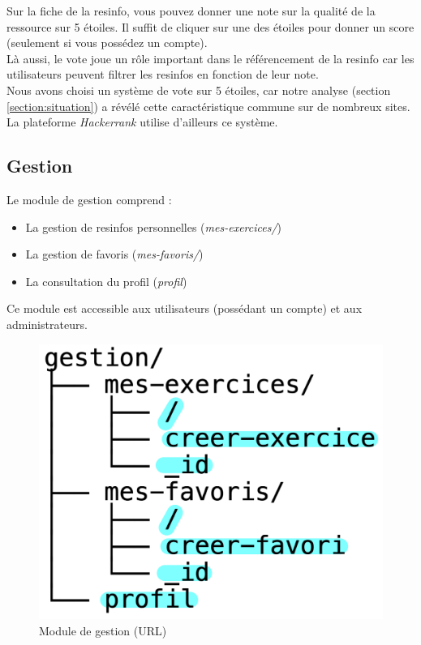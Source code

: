 
Sur la \gls{fiche} de la \gls{resinfo}, vous pouvez donner une note sur la qualité de la ressource sur 5 étoiles. Il suffit de cliquer sur une des étoiles pour donner un score (seulement si vous possédez un compte).\\

Là aussi, le vote joue un rôle important dans le référencement de la \gls{resinfo} car les utilisateurs peuvent filtrer les \glspl{resinfo} en fonction de leur note.\\

Nous avons choisi un système de vote sur 5 étoiles, car notre analyse (section \ref{section:situation}) a révélé cette caractéristique commune sur de nombreux sites. La plateforme \textit{Hackerrank} utilise d'ailleurs ce système.


\subsection{Gestion}

Le module de gestion comprend :

\begin{itemize}
    \item La gestion de \glspl{resinfo} personnelles (\textit{mes-exercices/})
    \item La gestion de favoris (\textit{mes-favoris/})
    \item La consultation du profil (\textit{profil})
\end{itemize}

Ce module est accessible aux utilisateurs (possédant un compte) et aux administrateurs.

\begin{figure}[H]
    \includegraphics[width=\textwidth,height=0.2\textheight,keepaspectratio]{images/client/gestion.jpeg}
    \centering
    \caption[SourceCode : module de gestion (URL)]{Module de gestion (URL)}
\end{figure}

